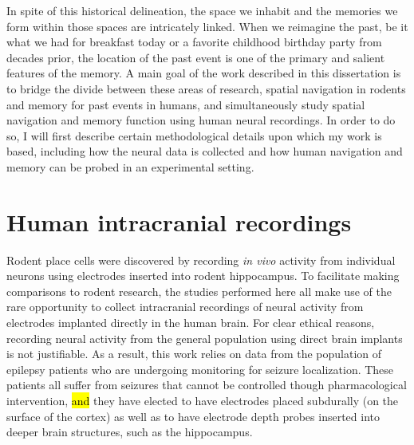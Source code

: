 In spite of this historical delineation, the space we inhabit and the memories we form within those spaces are intricately linked. When we reimagine the past, be it what we had for breakfast today or a favorite childhood birthday party from decades prior, the location of the past event is one of the primary and salient features of the memory. A main goal of the work described in this dissertation is to bridge the divide between these areas of research, spatial navigation in rodents and memory for past events in humans, and simultaneously study spatial navigation and memory function using human neural recordings. In order to do so, I will first describe certain methodological details upon which my work is based, including how the neural data is collected and how human navigation and memory can be probed in an experimental setting.









\section{Human intracranial recordings}

Rodent place cells were discovered by recording \textit{in vivo} activity from individual neurons using electrodes inserted into rodent hippocampus. To facilitate making comparisons to rodent research, the studies performed here all make use of the rare opportunity to collect intracranial recordings of neural activity from electrodes implanted directly in the human brain. For clear ethical reasons, recording neural activity from the general population using direct brain implants is not justifiable. As a result, this work relies on data from the population of epilepsy patients who are undergoing monitoring for seizure localization. These patients all suffer from seizures that cannot be controlled though pharmacological intervention, \hl{and} they have elected to have electrodes placed subdurally (on the surface of the cortex) as well as to have electrode depth probes inserted into deeper brain structures, such as the hippocampus.

